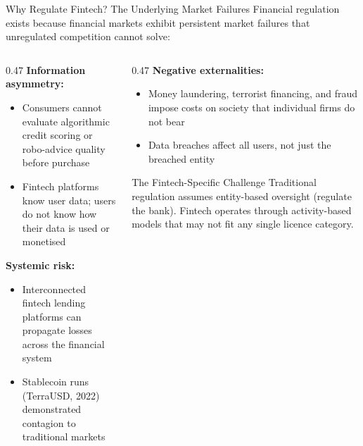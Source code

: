 \begin{frame}{Why Regulate Fintech? The Underlying Market Failures}
  Financial regulation exists because financial markets exhibit persistent
  \textcolor{mlpurple}{market failures} that unregulated competition cannot solve:

  \vspace{0.5em}
  \begin{columns}[T]
    \begin{column}{0.47\textwidth}
      \textcolor{mlpurple}{\textbf{Information asymmetry:}}
      \begin{itemize}
        \item Consumers cannot evaluate algorithmic credit scoring or robo-advice
              quality before purchase
        \item Fintech platforms know user data; users do not know how their data
              is used or monetised
      \end{itemize}
      \vspace{0.3em}
      \textcolor{mlblue}{\textbf{Systemic risk:}}
      \begin{itemize}
        \item Interconnected fintech lending platforms can propagate losses
              across the financial system
        \item Stablecoin runs (TerraUSD, 2022) demonstrated contagion to
              traditional markets
      \end{itemize}
    \end{column}
    \begin{column}{0.47\textwidth}
      \textcolor{mlgreen}{\textbf{Negative externalities:}}
      \begin{itemize}
        \item Money laundering, terrorist financing, and fraud impose costs on
              society that individual firms do not bear
        \item Data breaches affect all users, not just the breached entity
      \end{itemize}
      \vspace{0.3em}
      \begin{alertblock}{The Fintech-Specific Challenge}
        Traditional regulation assumes \textcolor{mlred}{entity-based}
        oversight (regulate the bank). Fintech operates through
        \textcolor{mlred}{activity-based} models that may not fit any
        single licence category.
      \end{alertblock}
    \end{column}
  \end{columns}
\end{frame}

